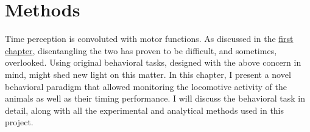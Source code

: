 \chapter{Methods} 
\label{ch:methods:methods}
Time perception is convoluted with motor functions.
As discussed in the \hyperref[ch:intro:intro]{first chapter}, disentangling the two has proven to be difficult, and sometimes, overlooked.
Using original behavioral tasks, designed with the above concern in mind, might shed new light on this matter.
In this chapter, I present a novel behavioral paradigm that allowed monitoring the locomotive activity of the animals as well as their timing performance.
I will discuss the behavioral task in detail, along with all the experimental and analytical methods used in this project.



